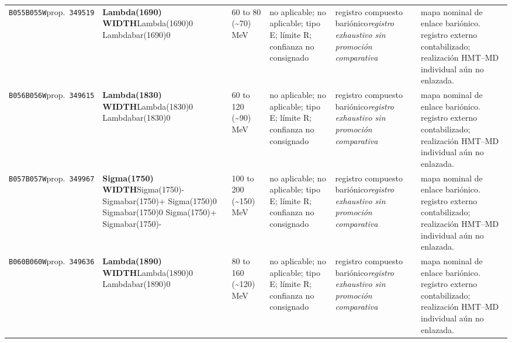 \begin{landscape}
\begin{longtable}{L{1.85cm}L{4.45cm}L{2.35cm}L{4.05cm}L{3.35cm}L{7.15cm}}
\texttt{B055}\newline \texttt{B055W}\newline prop.\ \texttt{349519} & \textbf{Lambda(1690) WIDTH}\newline Lambda(1690)0 \textbar{}\allowbreak{} Lambdabar(1690)0 & 60 to 80 (\textasciitilde{}70)\,MeV & no aplicable; no aplicable; tipo E; límite R; confianza no consignado & registro compuesto bariónico\newline \emph{registro exhaustivo sin promoción comparativa} & mapa nominal de enlace bariónico. registro externo contabilizado; realización HMT--MD individual aún no enlazada. \\
\texttt{B056}\newline \texttt{B056W}\newline prop.\ \texttt{349615} & \textbf{Lambda(1830) WIDTH}\newline Lambda(1830)0 \textbar{}\allowbreak{} Lambdabar(1830)0 & 60 to 120 (\textasciitilde{}90)\,MeV & no aplicable; no aplicable; tipo E; límite R; confianza no consignado & registro compuesto bariónico\newline \emph{registro exhaustivo sin promoción comparativa} & mapa nominal de enlace bariónico. registro externo contabilizado; realización HMT--MD individual aún no enlazada. \\
\texttt{B057}\newline \texttt{B057W}\newline prop.\ \texttt{349967} & \textbf{Sigma(1750) WIDTH}\newline Sigma(1750)- \textbar{}\allowbreak{} Sigmabar(1750)+ \textbar{}\allowbreak{} Sigma(1750)0 \textbar{}\allowbreak{} Sigmabar(1750)0 \textbar{}\allowbreak{} Sigma(1750)+ \textbar{}\allowbreak{} Sigmabar(1750)- & 100 to 200 (\textasciitilde{}150)\,MeV & no aplicable; no aplicable; tipo E; límite R; confianza no consignado & registro compuesto bariónico\newline \emph{registro exhaustivo sin promoción comparativa} & mapa nominal de enlace bariónico. registro externo contabilizado; realización HMT--MD individual aún no enlazada. \\
\texttt{B060}\newline \texttt{B060W}\newline prop.\ \texttt{349636} & \textbf{Lambda(1890) WIDTH}\newline Lambda(1890)0 \textbar{}\allowbreak{} Lambdabar(1890)0 & 80 to 160 (\textasciitilde{}120)\,MeV & no aplicable; no aplicable; tipo E; límite R; confianza no consignado & registro compuesto bariónico\newline \emph{registro exhaustivo sin promoción comparativa} & mapa nominal de enlace bariónico. registro externo contabilizado; realización HMT--MD individual aún no enlazada. \\

\end{longtable}
\end{landscape}
